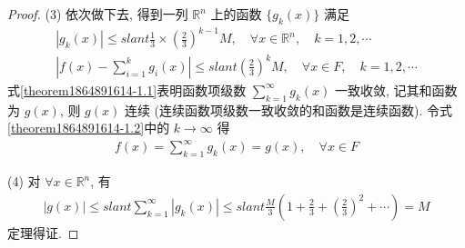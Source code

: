 \documentclass[../../main.tex]{subfiles}
\begin{document}
\begin{proof}
(3) 依次做下去, 得到一列 $\mathbb{R}^n$ 上的函数 $\{g_k(x)\}$ 满足
\begin{gather}
|g_k(x)| \leqslant slant \frac{1}{3} \times \left(\frac{2}{3}\right)^{k - 1} M, \quad \forall x \in \mathbb{R}^n, \quad k = 1, 2, \cdots
\label{theorem1864891614-1.1}
\\
\left|f(x) - \sum_{i = 1}^{k} g_i(x)\right| \leqslant slant \left(\frac{2}{3}\right)^k M, \quad \forall x \in F, \quad k = 1, 2, \cdots
\label{theorem1864891614-1.2}
\end{gather}
式\eqref{theorem1864891614-1.1}表明函数项级数 $\sum_{k = 1}^{\infty} g_k(x)$ 一致收敛, 记其和函数为 $g(x)$, 则 $g(x)$ 连续 (连续函数项级数一致收敛的和函数是连续函数). 令式 \eqref{theorem1864891614-1.2}中的 $k \to \infty$ 得
\begin{align*}
f(x) = \sum_{k = 1}^{\infty} g_k(x) = g(x), \quad \forall x \in F
\end{align*}

(4) 对 $\forall x \in \mathbb{R}^n$, 有
\begin{align*}
|g(x)| \leqslant slant \sum_{k = 1}^{\infty}|g_k(x)| \leqslant slant \frac{M}{3}\left(1 + \frac{2}{3} + \left(\frac{2}{3}\right)^2 + \cdots\right) = M
\end{align*}
定理得证.
\end{proof}
\end{document}
